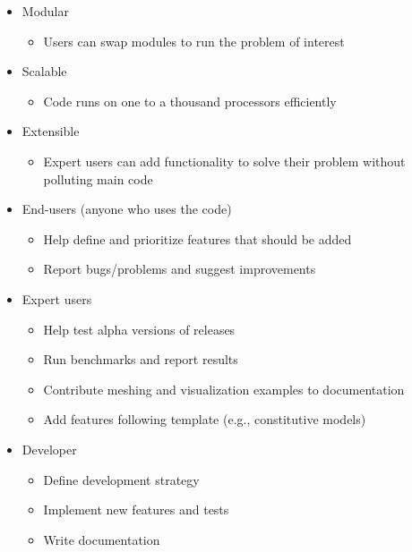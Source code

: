\documentclass[pdftex,cig,slideColor]{pp4slides}
\begin{document}
  
  
  \begin{itemize}
  \item Modular
    \begin{itemize}
    \item Users can swap modules to run the problem of interest
    \end{itemize}
  \item Scalable
    \begin{itemize}
    \item Code runs on one to a thousand processors efficiently
    \end{itemize}    
  \item Extensible
    \begin{itemize}
    \item Expert users can add functionality to solve their problem
      without polluting main code
    \end{itemize}
  \end{itemize}


  \begin{itemize}
  \item End-users (anyone who uses the code)
    \begin{itemize}
    \item Help define and prioritize features that should be added
    \item Report bugs/problems and suggest improvements
    \end{itemize}
  \item Expert users
    \begin{itemize}
    \item Help test alpha versions of releases
    \item Run benchmarks and report results
    \item Contribute meshing and visualization examples to documentation
    \item Add features following template (e.g., constitutive models)
    \end{itemize}
  \item Developer
    \begin{itemize}
    \item Define development strategy 
    \item Implement new features and tests
    \item Write documentation
    \end{itemize}
  \end{itemize}
\end{document}
